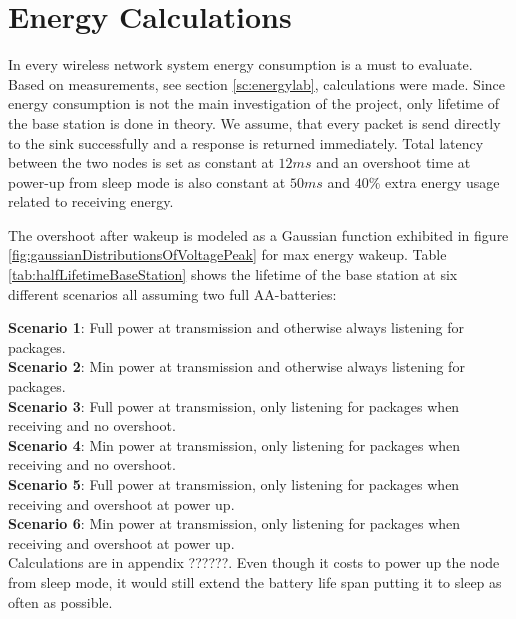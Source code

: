 \section{Energy Calculations}\label{sc:energyCalculations}

In every wireless network system energy consumption is a must to evaluate. Based on measurements, see section \ref{sc:energylab}, calculations were made. Since energy consumption is not the main investigation of the project, only lifetime of the base station is done in theory. We assume, that every packet is send directly to the sink successfully and a response is returned immediately. Total latency between the two nodes is set as constant at $12 ms$ and an overshoot time at power-up from sleep mode is also constant at $50 ms$ and $40\%$ extra energy usage related to receiving energy.

\noindent The overshoot after wakeup is modeled as a Gaussian function exhibited in figure \ref{fig:gaussianDistributionsOfVoltagePeak} for max energy wakeup. Table \ref{tab:halfLifetimeBaseStation} shows the lifetime of the base station at six different scenarios all assuming two full AA-batteries:%

\noindent \textbf{Scenario 1}: Full power at transmission and otherwise always listening for packages.\\
\textbf{Scenario 2}: Min power at transmission and otherwise always listening for packages.\\
\textbf{Scenario 3}: Full power at transmission, only listening for packages when receiving and no overshoot.\\
\textbf{Scenario 4}: Min power at transmission, only listening for packages when receiving and no overshoot.\\
\textbf{Scenario 5}: Full power at transmission, only listening for packages when receiving and overshoot at power up.\\
\textbf{Scenario 6}: Min power at transmission, only listening for packages when receiving and overshoot at power up.\\

Calculations are in appendix ??????. Even though it costs to power up the node from sleep mode, it would still extend the battery life span putting it to sleep as often as possible. %

